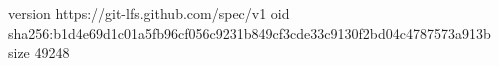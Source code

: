version https://git-lfs.github.com/spec/v1
oid sha256:b1d4e69d1c01a5fb96cf056c9231b849cf3cde33c9130f2bd04c4787573a913b
size 49248
